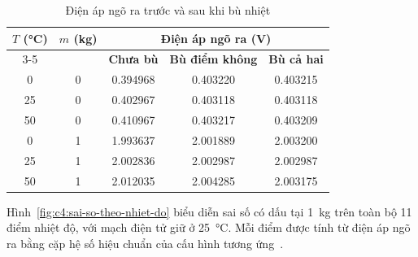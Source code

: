 \begin{table}[H]
    \centering
    \caption{Điện áp ngõ ra trước và sau khi bù nhiệt}
    \label{tab:c4:ket-qua-bu-nhiet}
    \renewcommand{\arraystretch}{1.3}
    \begin{tabular}{|c|c|c|c|c|}
        \hline
        \multirow{2}{*}{\textbf{$T$ (\unit{\celsius})}} &
        \multirow{2}{*}{\textbf{$m$ (\unit{\kilo\gram})}} &
        \multicolumn{3}{c|}{\textbf{Điện áp ngõ ra (\unit{\volt})}}
        \\ \cline{3-5}
        & & \textbf{Chưa bù} & \textbf{Bù điểm không} &
        \textbf{Bù cả hai} \\ \hline
        0  & 0 & 0.394968 & 0.403220 & 0.403215 \\ \hline
        25 & 0 & 0.402967 & 0.403118 & 0.403118 \\ \hline
        50 & 0 & 0.410967 & 0.403217 & 0.403209 \\ \hline
        0  & 1 & 1.993637 & 2.001889 & 2.003200 \\ \hline
        25 & 1 & 2.002836 & 2.002987 & 2.002987 \\ \hline
        50 & 1 & 2.012035 & 2.004285 & 2.003175 \\ \hline
    \end{tabular}
\end{table}


Hình~\ref{fig:c4:sai-so-theo-nhiet-do} biểu diễn sai số có dấu tại
\qty{1}{\kilo\gram} trên toàn bộ 11 điểm nhiệt độ, với mạch điện tử giữ
ở \qty{25}{\celsius}. Mỗi điểm được tính từ điện áp ngõ ra bằng cặp
hệ số hiệu chuẩn của cấu hình tương ứng~\cite{c4_ket_qua}.




